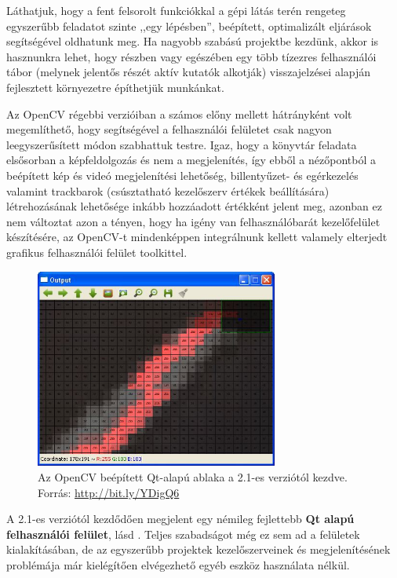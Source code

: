 Láthatjuk, hogy a fent felsorolt funkciókkal a gépi látás terén rengeteg egyszerűbb feladatot szinte ,,egy lépésben'', beépített, optimalizált eljárások segítségével oldhatunk meg. Ha nagyobb szabású projektbe kezdünk, akkor is hasznunkra lehet, hogy részben vagy egészében egy több tízezres felhasználói tábor (melynek jelentős részét aktív kutatók alkotják) visszajelzései alapján fejlesztett környezetre építhetjük munkánkat.

\bigskip

Az OpenCV régebbi verzióiban a számos előny mellett hátrányként volt megemlíthető, hogy segítségével a felhasználói felületet csak nagyon leegyszerűsített módon szabhattuk testre. Igaz, hogy a könyvtár feladata elsősorban a képfeldolgozás és nem a megjelenítés, így ebből a nézőpontból a beépített kép és videó megjelenítési lehetőség, billentyűzet- és egérkezelés valamint trackbarok (csúsztatható kezelőszerv értékek beállítására) létrehozásának lehetősége inkább hozzáadott értékként jelent meg, azonban ez nem változtat azon a tényen, hogy ha igény van felhasználóbarát kezelőfelület készítésére, az OpenCV-t mindenképpen integrálnunk kellett valamely elterjedt grafikus felhasználói felület toolkittel.

\begin{figure}[!ht]
\centering
\includegraphics[width=80mm, keepaspectratio]{figures/opencv_qt.jpg}
\caption{Az OpenCV beépített Qt-alapú ablaka a 2.1-es verziótól kezdve.\\Forrás: \url{http://bit.ly/YDigQ6}}
\label{fig:opencv_qt}
\end{figure}

A 2.1-es verziótól kezdődően megjelent egy némileg fejlettebb \textbf{Qt alapú felhasználói felület}, lásd . Teljes szabadságot még ez sem ad a felületek kialakításában, de az egyszerűbb projektek kezelőszerveinek és megjelenítésének problémája már kielégítően elvégezhető egyéb eszköz használata nélkül.

